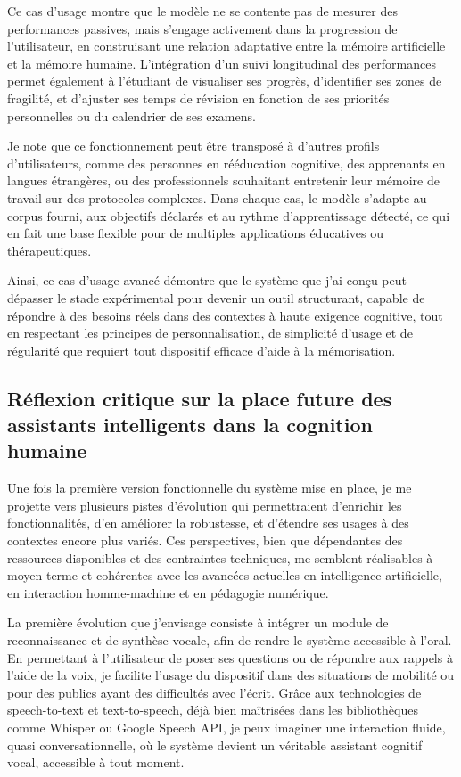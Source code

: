 \documentclass[11pt,a4paper]{report}
\begin{document}
Ce cas d’usage montre que le modèle ne se contente pas de mesurer des performances passives, mais s’engage activement dans la progression de l’utilisateur, en construisant une relation adaptative entre la mémoire artificielle et la mémoire humaine. L’intégration d’un suivi longitudinal des performances permet également à l’étudiant de visualiser ses progrès, d’identifier ses zones de fragilité, et d’ajuster ses temps de révision en fonction de ses priorités personnelles ou du calendrier de ses examens.

Je note que ce fonctionnement peut être transposé à d’autres profils d’utilisateurs, comme des personnes en rééducation cognitive, des apprenants en langues étrangères, ou des professionnels souhaitant entretenir leur mémoire de travail sur des protocoles complexes. Dans chaque cas, le modèle s’adapte au corpus fourni, aux objectifs déclarés et au rythme d’apprentissage détecté, ce qui en fait une base flexible pour de multiples applications éducatives ou thérapeutiques.

Ainsi, ce cas d’usage avancé démontre que le système que j’ai conçu peut dépasser le stade expérimental pour devenir un outil structurant, capable de répondre à des besoins réels dans des contextes à haute exigence cognitive, tout en respectant les principes de personnalisation, de simplicité d’usage et de régularité que requiert tout dispositif efficace d’aide à la mémorisation.

\subsection{Réflexion critique sur la place future des assistants intelligents dans la cognition humaine}

Une fois la première version fonctionnelle du système mise en place, je me projette vers plusieurs pistes d’évolution qui permettraient d’enrichir les fonctionnalités, d’en améliorer la robustesse, et d’étendre ses usages à des contextes encore plus variés. Ces perspectives, bien que dépendantes des ressources disponibles et des contraintes techniques, me semblent réalisables à moyen terme et cohérentes avec les avancées actuelles en intelligence artificielle, en interaction homme-machine et en pédagogie numérique.

La première évolution que j’envisage consiste à intégrer un module de reconnaissance et de synthèse vocale, afin de rendre le système accessible à l’oral. En permettant à l’utilisateur de poser ses questions ou de répondre aux rappels à l’aide de la voix, je facilite l’usage du dispositif dans des situations de mobilité ou pour des publics ayant des difficultés avec l’écrit. Grâce aux technologies de speech-to-text et text-to-speech, déjà bien maîtrisées dans les bibliothèques comme Whisper ou Google Speech API, je peux imaginer une interaction fluide, quasi conversationnelle, où le système devient un véritable assistant cognitif vocal, accessible à tout moment.
\end{document}
